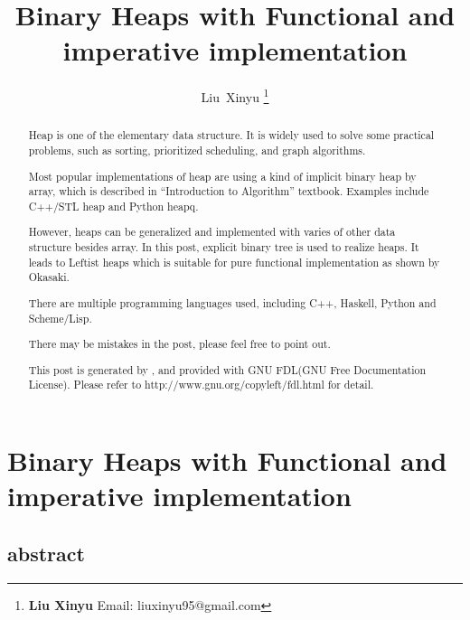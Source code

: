 \documentclass{article}
\begin{document}
\fi


\title{Binary Heaps with Functional and imperative implementation}

\author{Liu~Xinyu
\thanks{{\bfseries Liu Xinyu } \newline
  Email: liuxinyu95@gmail.com \newline}
  }


\maketitle

\ifx\wholebook\relax
\chapter{Binary Heaps with Functional and imperative implementation}

\section{abstract}
\else
\begin{abstract}
\fi
Heap is one of the elementary data structure. It is widely used
to solve some practical problems, such as sorting, prioritized
scheduling, and graph algorithms\cite{wiki-heap}. 

Most popular implementations of heap are using a kind of implicit
binary heap by array, which is described in ``Introduction to 
Algorithm'' textbook\cite{CLRS}. Examples include C++/STL
heap and Python heapq.

However, heaps can be generalized and implemented with varies
of other data structure besides array. In this post, explicit
binary tree is used to realize heaps. It leads to Leftist heaps
which is suitable for pure functional implementation as shown
by Okasaki\cite{okasaki-book}.

There are multiple programming languages used, including
C++, Haskell, Python and Scheme/Lisp.

There may be mistakes in the post, please feel free to point out.

This post is generated by \LaTeXe, and provided with GNU FDL(GNU Free Documentation License).
Please refer to http://www.gnu.org/copyleft/fdl.html for detail.

\ifx\wholebook\relax \else
\end{abstract}
\fi
\end{document}
